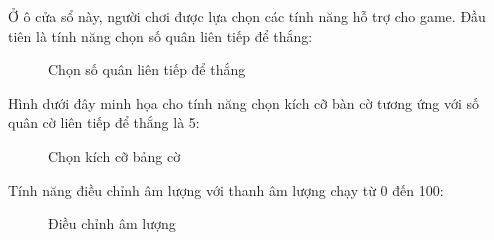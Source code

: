 Ở ô cửa sổ này, người chơi được lựa chọn các tính năng hỗ trợ cho game. Đầu tiên là tính năng chọn số quân liên tiếp để thắng:\\
\begin{figure}[H]
\caption{Chọn số quân liên tiếp để thắng}
\end{figure}
Hình dưới đây minh họa cho tính năng chọn kích cỡ bàn cờ tương ứng với số quân cờ liên tiếp để thắng là 5:\\
\begin{figure}[H]
\caption{Chọn kích cỡ bảng cờ}
\end{figure}
Tính năng điều chỉnh âm lượng với thanh âm lượng chạy từ 0 đến 100:\\
\begin{figure}[H]
\caption{Điều chỉnh âm lượng}
\end{figure}

